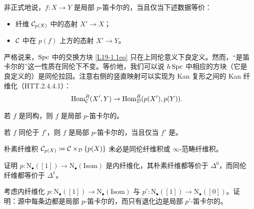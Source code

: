 
\begin{remark}\label{L19-1.3}
非正式地说，$f\colon X\to Y$ 是局部 $p$-笛卡尔的，当且仅当下述数据等价：
\begin{itemize}[leftmargin=2.2em,itemsep=0.1em]
\item 纤维 $\mathcal{C}_{p(X)}$ 中的态射 $X'\to X$；
\item $\mathcal{C}$ 中在 $p(f)$ 上方的态射 $X'\to Y$。
\end{itemize}
\end{remark}

\begin{remark}\label{L19-1.4}
严格说来，$\operatorname{Spc}$ 中的交换方块 \eqref{L19-1.1eq} 只在上同伦意义下良定义。然而，“是笛卡尔的”这一性质在同伦下不变。等价地，我们可以说 $h\operatorname{Spc}$ 中相应的方块（它是良定义的）是同伦拉回。注意右侧的竖直映射可以实现为 Kan 复形之间的 Kan 纤维化（HTT.2.4.4.1）：
\[
\operatorname{Hom}^{R}_{\mathcal{C}}(X',Y)\to\operatorname{Hom}^{R}_{\mathcal{D}}(p(X'),p(Y)).
\]
\end{remark}

\begin{exercise}\label{L19-1.5}
若 $f$ 是同构，则 $f$ 是局部 $p$-笛卡尔的。
\end{exercise}

\begin{exercise}\label{L19-1.6}
若 $f$ 同伦于 $f'$，则 $f$ 是局部 $p$-笛卡尔的，当且仅当 $f'$ 是。
\end{exercise}

\begin{warning}\label{L19-1.7}
朴素纤维积 $\mathcal{C}_{p(X)}\coloneqq\mathcal{C}\times_{\mathcal{D}}\{p(X)\}$ 未必是同伦纤维积或 $\infty$-范畴纤维积。
\end{warning}

\begin{exercise}\label{L19-1.8}
证明 $p\colon\mathrm{N}_{\bullet}([1])\to\mathrm{N}_{\bullet}(\mathrm{Isom})$ 是内纤维化，其朴素纤维都等价于 $\Delta^0$，而同伦纤维都等价于 $\Delta^1$。
\end{exercise}

\begin{exercise}\label{L19-1.9}
考虑内纤维化 $p\colon\mathrm{N}_{\bullet}([1])\to\mathrm{N}_{\bullet}(\mathrm{Isom})$ 与 $p'\colon\mathrm{N}_{\bullet}([1])\to\mathrm{N}_{\bullet}([0])$。证明：源中每条边都是局部 $p$-笛卡尔的，而只有退化边是局部 $p'$-笛卡尔的。
\end{exercise}


